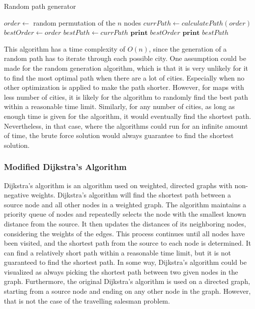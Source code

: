 \documentclass{article}
\begin{document}
\begin{algorithm}[H]
\caption{Random path generator}
\begin{algorithmic}

    \State $order \gets $ random permutation of the $n$ nodes
    \State $currPath \gets calculatePath(order)$ \Comment{\textcolor{blue}{$calculatePath(array)$ returns the length of the whole path}}
        \State $bestOrder \gets order$
        \State $bestPath \gets currPath$
    \EndIf
\EndWhile
\State $\textbf{print } bestOrder $
\State $\textbf{print } bestPath $

\end{algorithmic}
\end{algorithm}

\noindent
This algorithm has a time complexity of $O(n)$, since the generation of a random path has to iterate through each possible city. One assumption could be made for the random generation algorithm, which is that it is very unlikely for it to find the most optimal path when there are a lot of cities. Especially when no other optimization is applied to make the path shorter. However, for maps with less number of cities, it is likely for the algorithm to randomly find the best path within a reasonable time limit. Similarly, for any number of cities, as long as enough time is given for the algorithm, it would eventually find the shortest path. Nevertheless, in that case, where the algorithms could run for an infinite amount of time, the brute force solution would always guarantee to find the shortest solution.

\subsubsection{Modified Dijkstra's Algorithm}\label{Dijkstras}
Dijkstra's algorithm is an algorithm used on weighted, directed graphs with non-negative weights. Dijkstra's algorithm will find the shortest path between a source node and all other nodes in a weighted graph. The algorithm maintains a priority queue of nodes and repeatedly selects the node with the smallest known distance from the source. It then updates the distances of its neighboring nodes, considering the weights of the edges. This process continues until all nodes have been visited, and the shortest path from the source to each node is determined. It can find a relatively short path within a reasonable time limit, but it is not guaranteed to find the shortest path. In some way, Dijkstra's algorithm could be visualized as always picking the shortest path between two given nodes in the graph. Furthermore, the original Dijkstra's algorithm is used on a directed graph, starting from a source node and ending on any other node in the graph. However, that is not the case of the travelling salesman problem.
\end{document}
